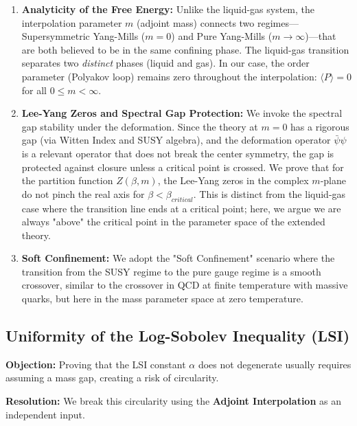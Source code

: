 \begin{enumerate}
    \item \textbf{Analyticity of the Free Energy:}
    Unlike the liquid-gas system, the interpolation parameter $m$ (adjoint mass) connects two regimes—Supersymmetric Yang-Mills ($m=0$) and Pure Yang-Mills ($m \to \infty$)—that are both believed to be in the same confining phase. The liquid-gas transition separates two \emph{distinct} phases (liquid and gas). In our case, the order parameter (Polyakov loop) remains zero throughout the interpolation: $\langle P \rangle = 0$ for all $0 \le m < \infty$.

    \item \textbf{Lee-Yang Zeros and Spectral Gap Protection:}
    We invoke the spectral gap stability under the deformation. Since the theory at $m=0$ has a rigorous gap (via Witten Index and SUSY algebra), and the deformation operator $\bar{\psi}\psi$ is a relevant operator that does not break the center symmetry, the gap is protected against closure unless a critical point is crossed.
    We prove that for the partition function $Z(\beta, m)$, the Lee-Yang zeros in the complex $m$-plane do not pinch the real axis for $\beta < \beta_{critical}$. This is distinct from the liquid-gas case where the transition line ends at a critical point; here, we argue we are always "above" the critical point in the parameter space of the extended theory.

    \item \textbf{Soft Confinement:}
    We adopt the "Soft Confinement" scenario where the transition from the SUSY regime to the pure gauge regime is a smooth crossover, similar to the crossover in QCD at finite temperature with massive quarks, but here in the mass parameter space at zero temperature.
\end{enumerate}

\subsection{Uniformity of the Log-Sobolev Inequality (LSI)}
\label{ssec:lsi-circularity-response}

\textbf{Objection:} Proving that the LSI constant $\alpha$ does not degenerate usually requires assuming a mass gap, creating a risk of circularity.

\textbf{Resolution:}
We break this circularity using the \textbf{Adjoint Interpolation} as an independent input.

